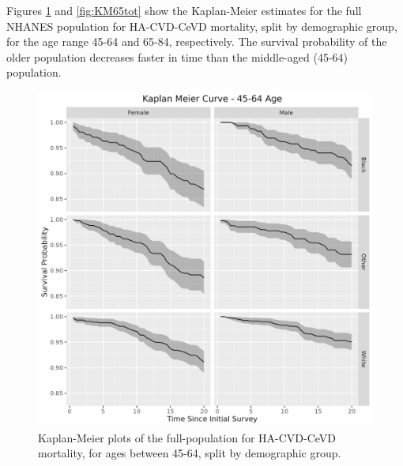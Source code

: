 \documentclass[
]{article}
\begin{document}
Figures \ref{fig:KM45tot} and \ref{fig:KM65tot} show the Kaplan-Meier estimates for the full NHANES population for HA-CVD-CeVD mortality, split by demographic group, for the age range 45-64 and 65-84, respectively. The survival probability of the older population decreases faster in time than the middle-aged (45-64) population.

\begin{figure}
\hypertarget{fig:KM45tot}{%
\centering
\includegraphics{./Rmarkdown_Plots/SurvProbKM_45-64.png}
\caption{Kaplan-Meier plots of the full-population for HA-CVD-CeVD mortality, for ages between 45-64, split by demographic group.}\label{fig:KM45tot}
}
\end{figure}
\end{document}
